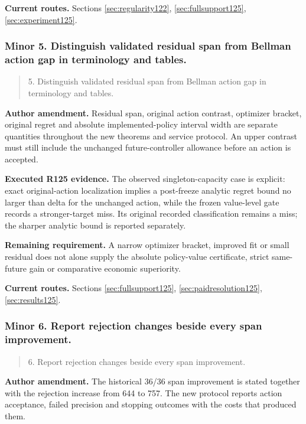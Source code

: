 \noindent\textbf{Current routes.} Sections \ref{sec:regularity122}, \ref{sec:fullsupport125}, \ref{sec:experiment125}.

\subsubsection{Minor 5. Distinguish validated residual span from Bellman action gap in terminology and tables.}

\begin{quote}\small
5. Distinguish validated residual span from Bellman action gap in terminology and tables.
\end{quote}

\noindent\textbf{Author amendment.} Residual span, original action contrast, optimizer bracket, original regret and absolute implemented-policy interval width are separate quantities throughout the new theorems and service protocol. An upper contrast must still include the unchanged future-controller allowance before an action is accepted.

\noindent\textbf{Executed R125 evidence.} The observed singleton-capacity case is explicit: exact original-action localization implies a post-freeze analytic regret bound no larger than delta for the unchanged action, while the frozen value-level gate records a stronger-target miss. Its original recorded classification remains a miss; the sharper analytic bound is reported separately.

\noindent\textbf{Remaining requirement.} A narrow optimizer bracket, improved fit or small residual does not alone supply the absolute policy-value certificate, strict same-future gain or comparative economic superiority.

\noindent\textbf{Current routes.} Sections \ref{sec:fullsupport125}, \ref{sec:paidresolution125}, \ref{sec:results125}.

\subsubsection{Minor 6. Report rejection changes beside every span improvement.}

\begin{quote}\small
6. Report rejection changes beside every span improvement.
\end{quote}

\noindent\textbf{Author amendment.} The historical 36/36 span improvement is stated together with the rejection increase from 644 to 757. The new protocol reports action acceptance, failed precision and stopping outcomes with the costs that produced them.


